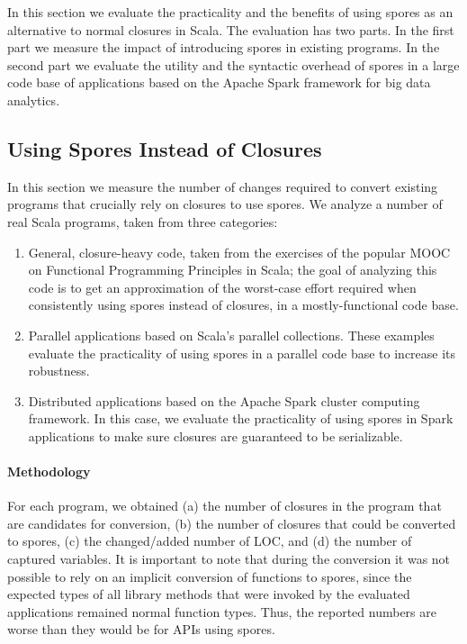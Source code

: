 \documentclass[runningheads]{llncs}
\begin{document}
\begin{sloppypar}
In this section we evaluate the practicality and the benefits of using spores
as an alternative to normal closures in Scala. The evaluation has two parts.
In the first part we measure the impact of introducing spores in existing
programs. In the second part we evaluate the utility and the syntactic overhead
of spores in a large code base of applications based on the Apache Spark
framework for big data analytics.

\subsection{Using Spores Instead of Closures}

In this section we measure the number of changes required to convert existing
programs that crucially rely on closures to use spores. We analyze a number of
real Scala programs, taken from three categories:
\begin{enumerate}
\vspace{-1mm}
\item General, closure-heavy code, taken from the exercises of the popular MOOC on Functional Programming Principles in Scala; the goal of analyzing this code is to get an approximation of the worst-case effort required when consistently using spores instead of closures, in a mostly-functional code base.

\item Parallel applications based on Scala's parallel collections. These examples evaluate the practicality of using spores in a parallel code base to increase its robustness.

\item Distributed applications based on the Apache Spark cluster computing framework. In this case, we evaluate the practicality of using spores in Spark applications to make sure closures are guaranteed to be serializable.
\vspace{-2mm}
\end{enumerate}

\paragraph{\textbf{Methodology}} For each program, we obtained (a) the number of closures in the program that are candidates for conversion, (b) the number of closures that could be converted to spores, (c) the changed/added number of LOC, and (d) the number of captured variables. It is important to note that during the conversion it was not possible to rely on an implicit conversion of functions to spores, since the expected types of all library methods that were invoked by the evaluated applications remained normal function types. Thus, the reported numbers are worse than they would be for APIs using spores.


\end{sloppypar}
\end{document}
